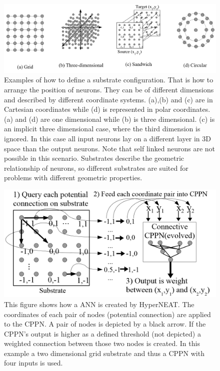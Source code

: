 \begin{figure}[tb]
	\centering
	\includegraphics[width=0.7\linewidth]{figures/HyperNeat/Substrates}
	\caption[Exemplar Substrate Configurations]{ Examples of how to define a substrate configuration. That is how to arrange the position of neurons. They can be of different dimensions and described by different coordinate systems. (a),(b) and (c) are in Cartesian coordinates while (d) is represented in polar coordinates. (a) and (d) are one dimensional while (b) is three dimensional. (c) is an implicit three dimensional case, where the third dimension is ignored. In this case all input neurons lay on a different layer in 3D space than the output neurons. Note that self linked neurons are not possible in this scenario. Substrates describe the geometric relationship of neurons, so different substrates are suited for problems with different geometric properties.
	\cite[p. 11]{HyperNEAT}}
	\label{fig:substrates}
\end{figure}



\begin{figure}[tb]
	\centering
	\includegraphics[width=0.7\linewidth]{figures/HyperNeat/QuerySubstrate}
	\caption[ANN creation with HyperNEAT]{This figure shows how a ANN is created by HyperNEAT. The coordinates of each pair of nodes (potential connection) are applied to the CPPN. A pair of nodes is depicted by a black arrow. If the CPPN's output is higher as a defined threshold (not depicted) a weighted connection between those two nodes is created. In this example a two dimensional grid substrate and thus a CPPN with four inputs is used. 	\cite[p. 9]{HyperNEAT} }
	\label{fig:querysubstrate}
\end{figure}


